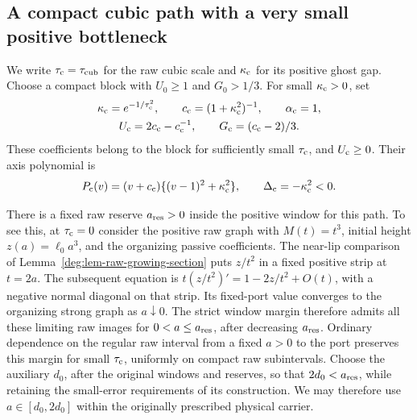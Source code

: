 \subsection{A compact cubic path with a very small positive bottleneck}
\label{rawstress:subsec-cubic}

We write \(\tau_{\rm c}=\tau_{\rm cub}\) for the raw cubic scale and
\(\kappa_{\rm c}\) for its positive ghost gap. Choose a compact block
with \(U_0\ge1\) and \(G_0>1/3\). For small \(\kappa_{\rm c}>0\), set
\begin{equation}\label{rawstress:eq-cubic-coefficients}
 \begin{gathered}
 \kappa_{\rm c}=e^{-1/\tau_{\rm c}^2},\qquad
 c_{\rm c}=(1+\kappa_{\rm c}^2)^{-1},\qquad \alpha_{\rm c}=1,\\
 U_{\rm c}=2c_{\rm c}-c_{\rm c}^{-1},\qquad
 G_{\rm c}=(c_{\rm c}-2)/3.
 \end{gathered}
\end{equation}
These coefficients belong to the block for sufficiently small
\(\tau_{\rm c}\), and \(U_{\rm c}\ge0\). Their axis polynomial is
\begin{equation}\label{rawstress:eq-cubic-polynomial}
 P_{\rm c}(v)=(v+c_{\rm c})
                   \{(v-1)^2+\kappa_{\rm c}^2\},
 \qquad \Delta_{\rm c}=-\kappa_{\rm c}^2<0.
\end{equation}

There is a fixed raw reserve \(a_{\rm res}>0\) inside the positive
window for this path. To see this, at \(\tau_{\rm c}=0\) consider the
positive raw graph with \(M(t)=t^3\), initial height
\(z(a)=\ell_0a^3\), and the organizing passive coefficients.
The near-lip comparison of Lemma~\ref{deg:lem-raw-growing-section}
puts \(z/t^2\) in a fixed positive strip at \(t=2a\). The subsequent
equation is
\(t(z/t^2)'=1-2z/t^2+O(t)\), with a negative normal diagonal on
that strip. Its fixed-port value converges to the organizing strong
graph as \(a\downarrow0\). The strict window margin therefore
admits all these limiting raw images for \(0<a\le a_{\rm res}\),
after decreasing \(a_{\rm res}\). Ordinary dependence on the regular
raw interval from a fixed \(a>0\) to the port preserves this margin
for small \(\tau_{\rm c}\), uniformly on compact raw subintervals.
Choose the auxiliary \(d_0\), after the original windows and reserves,
so that \(2d_0<a_{\rm res}\), while retaining the small-error
requirements of its construction. We may therefore use \(a\in[d_0,2d_0]\) within the originally
prescribed physical carrier.

